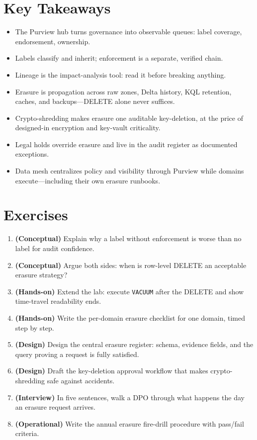 \section*{Key Takeaways}
\begin{itemize}
    \item The Purview hub turns governance into observable queues: label coverage, endorsement, ownership.
    \item Labels classify and inherit; enforcement is a separate, verified chain.
    \item Lineage is the impact-analysis tool: read it before breaking anything.
    \item Erasure is propagation across raw zones, Delta history, KQL retention, caches, and backups---DELETE alone never suffices.
    \item Crypto-shredding makes erasure one auditable key-deletion, at the price of designed-in encryption and key-vault criticality.
    \item Legal holds override erasure and live in the audit register as documented exceptions.
    \item Data mesh centralizes policy and visibility through Purview while domains execute---including their own erasure runbooks.
\end{itemize}

\section{Exercises}
\begin{enumerate}
    \item \textbf{(Conceptual)} Explain why a label without enforcement is worse than no label for audit confidence.
    \item \textbf{(Conceptual)} Argue both sides: when is row-level DELETE an acceptable erasure strategy?
    \item \textbf{(Hands-on)} Extend the lab: execute \texttt{VACUUM} after the DELETE and show time-travel readability ends.
    \item \textbf{(Hands-on)} Write the per-domain erasure checklist for one domain, timed step by step.
    \item \textbf{(Design)} Design the central erasure register: schema, evidence fields, and the query proving a request is fully satisfied.
    \item \textbf{(Design)} Draft the key-deletion approval workflow that makes crypto-shredding safe against accidents.
    \item \textbf{(Interview)} In five sentences, walk a DPO through what happens the day an erasure request arrives.
    \item \textbf{(Operational)} Write the annual erasure fire-drill procedure with pass/fail criteria.
\end{enumerate}

